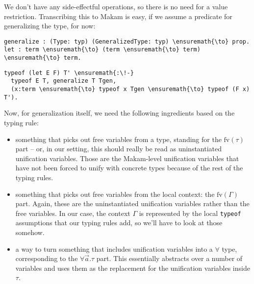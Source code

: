 \vspace{-1.2em}\begin{mathpar}
\end{mathpar}

We don't have any side-effectful operations, so there is no need for a
value restriction. Transcribing this to Makam is easy, if we assume a
predicate for generalizing the type, for now:

\begin{verbatim}
generalize : (Type: typ) (GeneralizedType: typ) \ensuremath{\to} prop.
let : term \ensuremath{\to} (term \ensuremath{\to} term) \ensuremath{\to} term.
\end{verbatim}

\importantCodeblock{}

\begin{verbatim}
typeof (let E F) T' \ensuremath{:\!-}
  typeof E T, generalize T Tgen,
  (x:term \ensuremath{\to} typeof x Tgen \ensuremath{\to} typeof (F x) T').
\end{verbatim}

\importantCodeblockEnd{}

Now, for generalization itself, we need the following ingredients based
on the typing rule:

\begin{itemize}
\tightlist
\item
  something that picks out free variables from a type, standing for the
  \(\text{fv}(\tau)\) part -- or, in our setting, this should really be
  read as uninstantiated unification variables. Those are the
  Makam-level unification variables that have not been forced to unify
  with concrete types because of the rest of the typing rules.
\item
  something that picks out free variables from the local context: the
  \(\text{fv}(\Gamma)\) part. Again, these are the uninstantiated
  unification variables rather than the free variables. In our case, the
  context \(\Gamma\) is represented by the local \texttt{typeof}
  assumptions that our typing rules add, so we'll have to look at those
  somehow.
\item
  a way to turn something that includes unification variables into a
  \(\forall\) type, corresponding to the \(\forall \vec{a}.\tau\) part.
  This essentially abstracts over a number of variables and uses them as
  the replacement for the unification variables inside \(\tau\).
\end{itemize}

